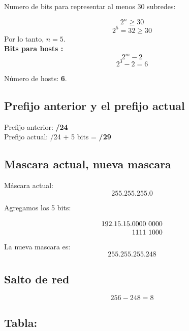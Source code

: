 \documentclass[letterpaper,12pt]{article}
\begin{document}
    Numero de bits   para representar al menos 30 subredes:
    
    \[2^n \geq 30\]
    \[2^{5} = 32 \geq 30\]
    Por lo tanto, $n = 5$. \\

    \textbf{Bits para hosts :} \\

    \[ 2^m - 2  \]
    \[ 2^{3} - 2 = 6 \]

    Número de hosts: \textbf{6}.

    \subsection{Prefijo anterior y el prefijo actual}
    Prefijo anterior: \textbf{/24} \\
    Prefijo actual: /24 + 5 bits   = \textbf{/29}

    \subsection{Mascara actual, nueva mascara}
    Máscara actual:
    \[ 255.255.255.0 \]

    Agregamos los 5 bits:

    \[
    192.15.15.\begin{array}[t]{@{}c@{}}
    0000 \ 0000  \\
    1111 \ 1000
    \end{array}
    \]
    La nueva mascara es:
    \[ 255.255.255.248 \]

    \subsection{Salto de red}

    \[ 256 - 248 = 8 \]

    \subsection{Tabla:}
\end{document}
